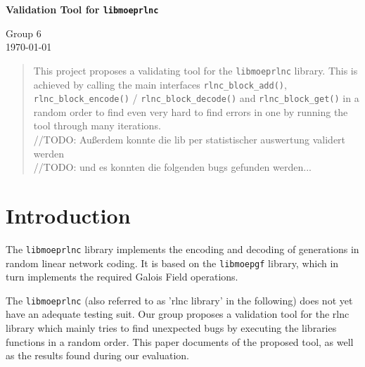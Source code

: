 \documentclass[a4paper,english,10pt]{tumarticle}
\begin{document}
\begin{center}
	\bfseries\Large Validation Tool for \texttt{libmoeprlnc}\\[.5\baselineskip]
\end{center}
\begin{center}
	\small Group 6\\
	\today
\end{center}


\setcounter{tocdepth}{1}
\renewcommand{\contentsname}{Anlagen}

\renewcommand{\emph}[1]{%
	\textcolor{TUMBlue}{#1}%
}


\renewcommand{\abstractname}{Abstract}
\begin{abstract}
\setlength{\parindent}{0pt}
\noindent%
\footnotesize

This project proposes a validating tool for the \texttt{libmoeprlnc} library. 
This is achieved by calling the main interfaces \texttt{rlnc\_block\_add()}, 
\texttt{rlnc\_block\_encode()} / \texttt{rlnc\_block\_decode()} and \texttt{rlnc\_block\_get()} in a 
random order to find even very hard to find errors in one by running the tool through 
many iterations.\\
//TODO: Außerdem konnte die lib per statistischer auswertung validert werden\\
//TODO: und es konnten die folgenden bugs gefunden werden...

\end{abstract}

\section{Introduction}

The \texttt{libmoeprlnc} library implements the encoding and decoding of generations in
random linear network coding. It is based on the \texttt{libmoepgf} library, which in turn
implements the required Galois Field operations.

The \texttt{libmoeprlnc} (also referred to as 'rlnc library' in the following) does not yet have an 
adequate testing suit. Our group proposes a validation tool for the rlnc library which mainly tries to 
find unexpected bugs by executing the libraries functions in a random order.
This paper documents of the proposed tool, as well as the results found during our evaluation.
\end{document}
